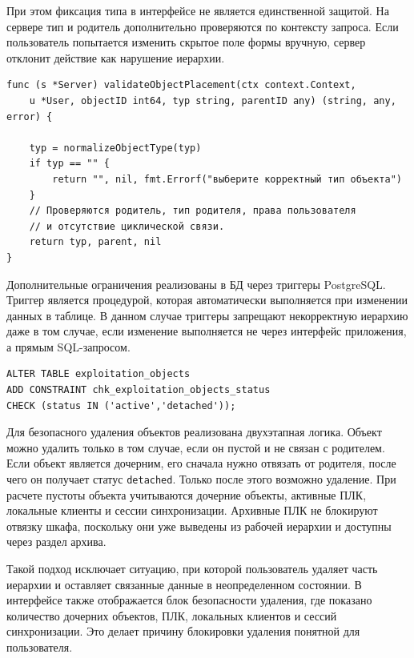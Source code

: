 При этом фиксация типа в интерфейсе не является единственной защитой. На сервере тип и родитель дополнительно проверяются по контексту запроса. Если пользователь попытается изменить скрытое поле формы вручную, сервер отклонит действие как нарушение иерархии.

\begin{samepage}
\begin{lstlisting}[caption={Проверка размещения объекта в иерархии}, label={lst:chapter3_object_placement}]
func (s *Server) validateObjectPlacement(ctx context.Context,
    u *User, objectID int64, typ string, parentID any) (string, any, error) {

    typ = normalizeObjectType(typ)
    if typ == "" {
        return "", nil, fmt.Errorf("выберите корректный тип объекта")
    }
    // Проверяются родитель, тип родителя, права пользователя
    // и отсутствие циклической связи.
    return typ, parent, nil
}
\end{lstlisting}
\end{samepage}

Дополнительные ограничения реализованы в БД через триггеры PostgreSQL. Триггер является процедурой, которая автоматически выполняется при изменении данных в таблице. В данном случае триггеры запрещают некорректную иерархию даже в том случае, если изменение выполняется не через интерфейс приложения, а прямым SQL-запросом.

\begin{samepage}
\begin{lstlisting}[caption={Ограничение допустимых статусов объекта на уровне БД}, label={lst:chapter3_object_status_sql}]
ALTER TABLE exploitation_objects
ADD CONSTRAINT chk_exploitation_objects_status
CHECK (status IN ('active','detached'));
\end{lstlisting}
\end{samepage}

Для безопасного удаления объектов реализована двухэтапная логика. Объект можно удалить только в том случае, если он пустой и не связан с родителем. Если объект является дочерним, его сначала нужно отвязать от родителя, после чего он получает статус \texttt{detached}. Только после этого возможно удаление. При расчете пустоты объекта учитываются дочерние объекты, активные ПЛК, локальные клиенты и сессии синхронизации. Архивные ПЛК не блокируют отвязку шкафа, поскольку они уже выведены из рабочей иерархии и доступны через раздел архива.

Такой подход исключает ситуацию, при которой пользователь удаляет часть иерархии и оставляет связанные данные в неопределенном состоянии. В интерфейсе также отображается блок безопасности удаления, где показано количество дочерних объектов, ПЛК, локальных клиентов и сессий синхронизации. Это делает причину блокировки удаления понятной для пользователя.


